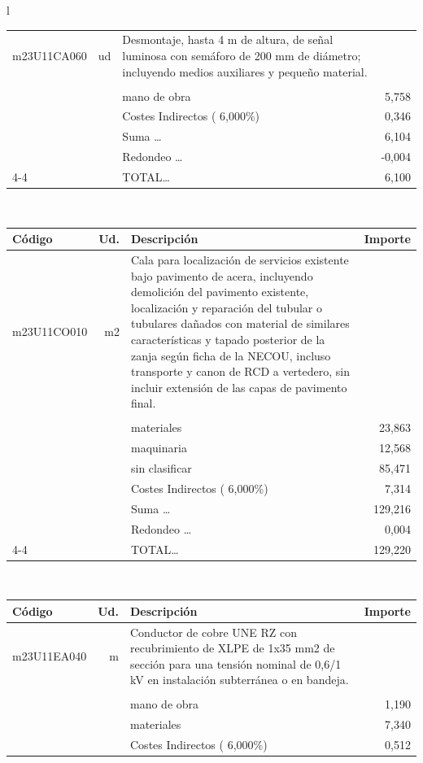 \documentclass{book}%
\begin{document}
\begin{longtable}{l}
\begin{tabular}{l r p{60mm} r}
\hline%
m23U11CA060&ud&Desmontaje, hasta 4 m de altura, de señal luminosa con semáforo de 200 mm de diámetro; incluyendo medios auxiliares y pequeño material.&\\%
&&&\\%
&&mano de obra&     5,758\\%
&&Costes Indirectos (     6,000\%)&     0,346\\%
&&Suma \ldots&     6,104\\%
&&Redondeo \ldots&    {-}0,004\\%
\cline{4-4}%
&&TOTAL\ldots&     6,100\\%
\end{tabular}\\%
\begin{tabular}{l r p{60mm} r}%
Código&Ud.&Descripción&Importe\\%
\hline%
m23U11CO010&m2&Cala para localización de servicios existente bajo pavimento de acera, incluyendo demolición del pavimento existente, localización y reparación del tubular o tubulares dañados con material de similares características y tapado posterior de la zanja según ficha de la NECOU, incluso transporte y canon de RCD a vertedero, sin incluir extensión de las capas de pavimento final.&\\%
&&&\\%
&&materiales&    23,863\\%
&&maquinaria&    12,568\\%
&&sin clasificar&    85,471\\%
&&Costes Indirectos (     6,000\%)&     7,314\\%
&&Suma \ldots&   129,216\\%
&&Redondeo \ldots&     0,004\\%
\cline{4-4}%
&&TOTAL\ldots&   129,220\\%
\end{tabular}\\%
\begin{tabular}{l r p{60mm} r}%
Código&Ud.&Descripción&Importe\\%
\hline%
m23U11EA040&m&Conductor de cobre UNE RZ con recubrimiento de XLPE de 1x35 mm2 de sección para una tensión nominal de 0,6/1 kV en instalación subterránea o en bandeja.&\\%
&&&\\%
&&mano de obra&     1,190\\%
&&materiales&     7,340\\%
&&Costes Indirectos (     6,000\%)&     0,512\\%

\end{tabular}
\end{longtable}
\end{document}

